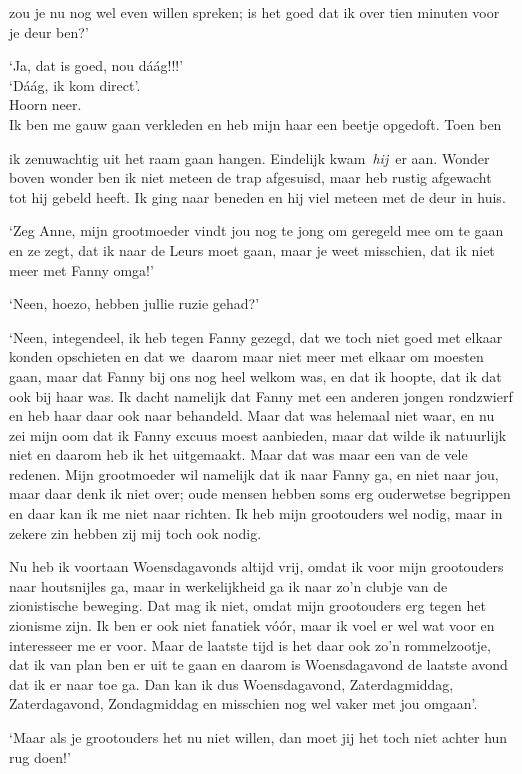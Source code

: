 \documentclass{book}
\begin{document}
zou je nu nog wel even willen spreken; is het goed dat ik over tien
minuten voor je deur ben?'

`Ja, dat is goed, nou dáág!!!'\\`Dáág, ik kom direct'.\\Hoorn neer.\\Ik
ben me gauw gaan verkleden en heb mijn haar een beetje opgedoft. Toen
ben

ik zenuwachtig uit het raam gaan hangen. Eindelijk kwam~\emph{hij}~er
aan. Wonder boven wonder ben ik niet meteen de trap afgesuisd, maar heb
rustig afgewacht tot hij gebeld heeft. Ik ging naar beneden en hij viel
meteen met de deur in huis.

`Zeg Anne, mijn grootmoeder vindt jou nog te jong om geregeld mee om te
gaan en ze zegt, dat ik naar de Leurs moet gaan, maar je weet misschien,
dat ik niet meer met Fanny omga!'

`Neen, hoezo, hebben jullie ruzie gehad?'

`Neen, integendeel, ik heb tegen Fanny gezegd, dat we toch niet goed met
elkaar konden opschieten en dat we~daarom maar niet meer met elkaar om
moesten gaan, maar dat Fanny bij ons nog heel welkom was, en dat ik
hoopte, dat ik dat ook bij haar was. Ik dacht namelijk dat Fanny met een
anderen jongen rondzwierf en heb haar daar ook naar behandeld. Maar dat
was helemaal niet waar, en nu zei mijn oom dat ik Fanny excuus moest
aanbieden, maar dat wilde ik natuurlijk niet en daarom heb ik het
uitgemaakt. Maar dat was maar een van de vele redenen. Mijn grootmoeder
wil namelijk dat ik naar Fanny ga, en niet naar jou, maar daar denk ik
niet over; oude mensen hebben soms erg ouderwetse begrippen en daar kan
ik me niet naar richten. Ik heb mijn grootouders wel nodig, maar in
zekere zin hebben zij mij toch ook nodig.

Nu heb ik voortaan Woensdagavonds altijd vrij, omdat ik voor mijn
grootouders naar houtsnijles ga, maar in werkelijkheid ga ik naar zo'n
clubje van de zionistische beweging. Dat mag ik niet, omdat mijn
grootouders erg tegen het zionisme zijn. Ik ben er ook niet fanatiek
vóór, maar ik voel er wel wat voor en interesseer me er voor. Maar de
laatste tijd is het daar ook zo'n rommelzootje, dat ik van plan ben er
uit te gaan en daarom is Woensdagavond de laatste avond dat ik er naar
toe ga. Dan kan ik dus Woensdagavond, Zaterdagmiddag, Zaterdagavond,
Zondagmiddag en misschien nog wel vaker met jou omgaan'.

`Maar als je grootouders het nu niet willen, dan moet jij het toch niet
achter hun rug doen!'
\end{document}
